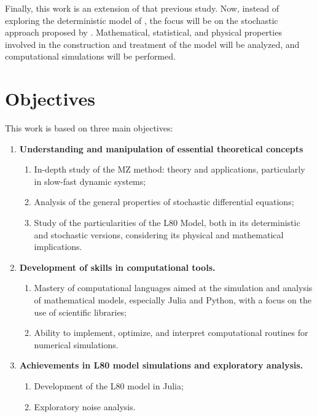 \documentclass[12pt]{article}
\begin{document}
Finally, this work is an extension of that previous study. Now, instead of exploring the deterministic model of \citet{Lorenz1980}, the focus will be on the stochastic approach proposed by \citet{Chekroun2021}. Mathematical, statistical, and physical properties involved in the construction and treatment of the model will be analyzed, and computational simulations will be performed.


\section*{Objectives}
This work is based on three main objectives:
\begin{enumerate}
	\item \textbf{Understanding and manipulation of essential theoretical concepts}
	      \begin{enumerate}
	      	\item In-depth study of the MZ method: theory and applications, particularly in slow-fast dynamic systems;
	      	\item Analysis of the general properties of stochastic differential equations;
	      	\item Study of the particularities of the L80 Model, both in its deterministic and stochastic versions, considering its physical and mathematical implications.
	      \end{enumerate}
	      
	\item \textbf{Development of skills in computational tools.}
	      \begin{enumerate}
	      	\item Mastery of computational languages aimed at the simulation and analysis of mathematical models, especially Julia and Python, with a focus on the use of scientific libraries;
	      	\item Ability to implement, optimize, and interpret computational routines for numerical simulations.
	      \end{enumerate}
	      
	\item \textbf{Achievements in L80 model simulations and exploratory analysis.}
	      \begin{enumerate}
	      	\item Development of the L80 model in Julia;
	      	\item Exploratory noise analysis.
	      \end{enumerate}
\end{enumerate}
\end{document}
